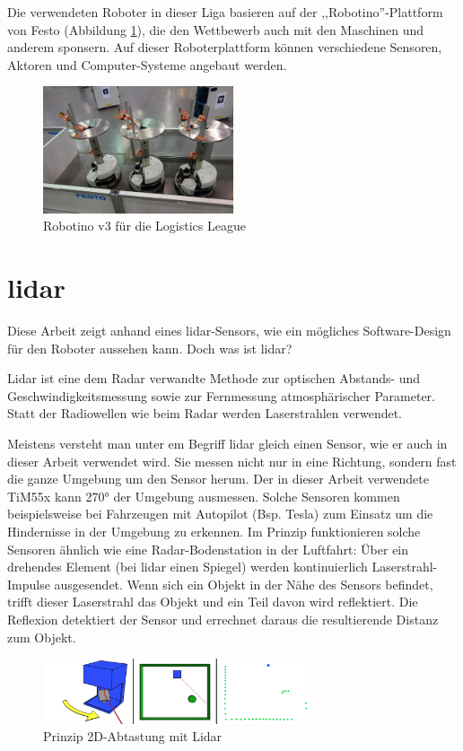 Die verwendeten Roboter in dieser Liga basieren auf der ,,Robotino''-Plattform  von Festo (Abbildung \ref{fig:robotino}), die den Wettbewerb auch mit den Maschinen und anderem sponsern. Auf dieser Roboterplattform können verschiedene Sensoren, Aktoren und Computer-Systeme angebaut werden.
\begin{figure}[H]
	\centering
	\includegraphics[width=0.5\textwidth]{img/robotino_v3.jpg}
	\caption{Robotino v3 für die Logistics League\cite{robotino}}
	\label{fig:robotino}
\end{figure}



\section{\acrshort{lidar}}
Diese Arbeit zeigt anhand eines \acrshort{lidar}-Sensors, wie ein mögliches Software-Design für den Roboter aussehen kann. Doch was ist \acrshort{lidar}?
\begin{formal}
	Lidar ist eine dem Radar verwandte Methode zur optischen Abstands- und Geschwindigkeitsmessung sowie zur Fernmessung atmosphärischer Parameter. Statt der Radiowellen wie beim Radar werden Laserstrahlen verwendet. \cite{wikipedia-lidar}
\end{formal}
Meistens versteht man unter em Begriff \acrshort{lidar} gleich einen Sensor, wie er auch in dieser Arbeit verwendet wird. Sie messen nicht nur in eine Richtung, sondern fast die ganze Umgebung um den Sensor herum. Der in dieser Arbeit verwendete TiM55x kann 270° der Umgebung ausmessen. Solche Sensoren kommen beispielsweise bei Fahrzeugen mit Autopilot (Bsp. Tesla) zum Einsatz um die Hindernisse in der Umgebung zu erkennen. Im Prinzip funktionieren solche Sensoren ähnlich wie eine Radar-Bodenstation in der Luftfahrt: Über ein drehendes Element (bei \acrshort{lidar} einen Spiegel) werden kontinuierlich Laserstrahl-Impulse ausgesendet. Wenn sich ein Objekt in der Nähe des Sensors befindet, trifft dieser Laserstrahl das Objekt und ein Teil davon wird reflektiert. Die Reflexion detektiert der Sensor und errechnet daraus die resultierende Distanz zum Objekt.
\begin{figure}[H]
	\centering
	\includegraphics[width=0.7\textwidth]{img/lidar-principle.png}
	\caption{Prinzip 2D-Abtastung mit Lidar \cite{wikipedia-lidar}}
	\label{fig:lidar-principle}
\end{figure}


